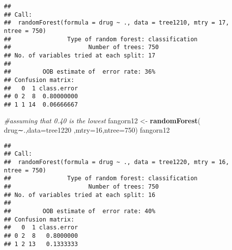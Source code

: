 \documentclass[]{article}
\newenvironment{Shaded}{\begin{snugshade}}{\end{snugshade}}
\newcommand{\KeywordTok}[1]{\textcolor[rgb]{0.13,0.29,0.53}{\textbf{#1}}}
\newcommand{\DataTypeTok}[1]{\textcolor[rgb]{0.13,0.29,0.53}{#1}}
\newcommand{\DecValTok}[1]{\textcolor[rgb]{0.00,0.00,0.81}{#1}}
\newcommand{\StringTok}[1]{\textcolor[rgb]{0.31,0.60,0.02}{#1}}
\newcommand{\CommentTok}[1]{\textcolor[rgb]{0.56,0.35,0.01}{\textit{#1}}}
\newcommand{\NormalTok}[1]{#1}
\begin{document}
\begin{verbatim}
## 
## Call:
##  randomForest(formula = drug ~ ., data = tree1210, mtry = 17,      ntree = 750) 
##                Type of random forest: classification
##                      Number of trees: 750
## No. of variables tried at each split: 17
## 
##         OOB estimate of  error rate: 36%
## Confusion matrix:
##   0  1 class.error
## 0 2  8  0.80000000
## 1 1 14  0.06666667
\end{verbatim}

\begin{Shaded}
\begin{Highlighting}[]
\CommentTok{#assuming that 0.40 is the lowest}
\NormalTok{fangorn12 <-}\StringTok{ }\KeywordTok{randomForest}\NormalTok{( drug∼.,}\DataTypeTok{data=}\NormalTok{tree1220  ,}\DataTypeTok{mtry=}\DecValTok{16}\NormalTok{,}\DataTypeTok{ntree=}\DecValTok{750}\NormalTok{)}
\NormalTok{fangorn12}
\end{Highlighting}
\end{Shaded}

\begin{verbatim}
## 
## Call:
##  randomForest(formula = drug ~ ., data = tree1220, mtry = 16,      ntree = 750) 
##                Type of random forest: classification
##                      Number of trees: 750
## No. of variables tried at each split: 16
## 
##         OOB estimate of  error rate: 40%
## Confusion matrix:
##   0  1 class.error
## 0 2  8   0.8000000
## 1 2 13   0.1333333
\end{verbatim}
\end{document}
